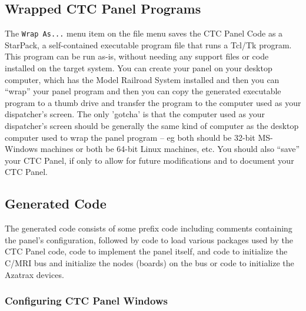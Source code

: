 \subsection{Wrapped CTC Panel Programs}
\label{sect:dispatcher:wrapas}

The \verb=Wrap As...= menu item on the file menu saves the CTC Panel
Code as a StarPack, a self-contained executable program file that runs
a Tcl/Tk program.  This program can be run as-is, without needing any
support files or code installed on the target system.  You can create
your panel on your desktop computer, which has the Model Railroad
System installed and then you can ``wrap'' your panel program and then
you can copy the generated executable program to a thumb drive and
transfer the program to the computer used as your dispatcher's screen.
The only 'gotcha' is that the computer used as your dispatcher's screen
should be generally the same kind of computer as the desktop computer
used to wrap the panel program -- eg both should be 32-bit MS-Windows
machines or both be 64-bit Linux machines, etc. You should also
``save'' your CTC Panel, if only to allow for future modifications and
to document your CTC Panel.  

\subsection{Generated Code}

The generated code consists of some prefix code including comments
containing the panel's configuration, followed by code to load various
packages used by the CTC Panel code, code to implement the panel
itself, and code to initialize the C/MRI bus and initialize the nodes
(boards) on the bus or code to initialize the Azatrax devices.

\subsubsection{Configuring CTC Panel Windows}
\label{sect:dispatcher:confpanel}

